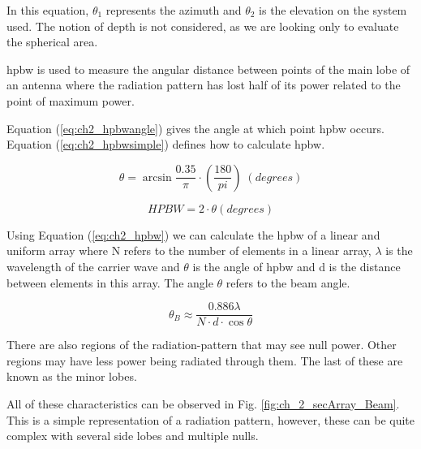 \par In this equation, $\theta_{1}$ represents the azimuth and $ \theta_{2}$ is the elevation on the system used. The notion of depth is not considered, as we are looking only to evaluate the spherical area.

\par \ac{hpbw} is used to measure the angular distance between points of the main lobe of an antenna where the radiation pattern has lost half of its power related to the point of maximum power.

\par Equation (\ref{eq:ch2_hpbwangle}) gives the angle at which point \ac{hpbw} occurs. Equation (\ref{eq:ch2_hpbwsimple}) defines how to calculate \ac{hpbw}.

\begin{equation}
    \label{eq:ch2_hpbwangle}
    \theta  = \arcsin{ \frac{ 0.35 }{\pi }}\cdot\left(\frac{180}{pi}\right)\; (degrees)
\end{equation}

\begin{equation}
    \label{eq:ch2_hpbwsimple}
    HPBW  = 2\cdot\theta(degrees)
\end{equation}

\par Using Equation (\ref{eq:ch2_hpbw}) we can calculate the \ac{hpbw} of a linear and uniform array where N refers to the number of elements in a linear array, $\lambda$ is the wavelength of the carrier wave and $\theta$ is the angle of \ac{hpbw} and d is the distance between elements in this array. The angle $\theta$ refers to the beam angle.

\begin{equation}
    \label{eq:ch2_hpbw}
    \theta_{B}\approx\frac{0.886\lambda}{N\cdot d\cdot\cos{\theta}}
\end{equation}



\par There are also regions of the radiation-pattern that may see null power. Other regions may have less power being radiated through them. The last of these are known as the minor lobes. 

\par All of these characteristics can be observed in Fig. \ref{fig:ch_2_secArray_Beam}. This is a simple representation of a radiation pattern, however, these can be quite complex with several side lobes and multiple nulls.

